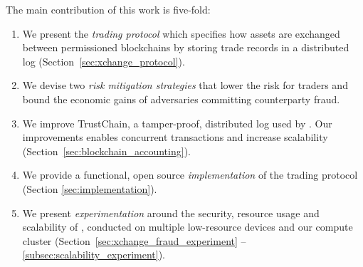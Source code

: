 
The main contribution of this work is five-fold:
\begin{enumerate}
	\item We present the \ModelName{} \emph{trading protocol} which specifies how assets are exchanged between permissioned blockchains by storing trade records in a distributed log (Section~\ref{sec:xchange_protocol}).
	\item We devise two \emph{risk mitigation strategies} that lower the risk for traders and bound the economic gains of adversaries committing counterparty fraud.
	\item We improve TrustChain, a tamper-proof, distributed log used by \ModelName{}. Our improvements enables concurrent transactions and increase scalability (Section~\ref{sec:blockchain_accounting}).
	\item We provide a functional, open source \emph{implementation} of the \ModelName{} trading protocol (Section \ref{sec:implementation}).
	\item We present \emph{experimentation} around the security, resource usage and scalability of \ModelName{}, conducted on multiple low-resource devices and our compute cluster (Section~\ref{sec:xchange_fraud_experiment} -- \ref{subsec:scalability_experiment}).
\end{enumerate}

